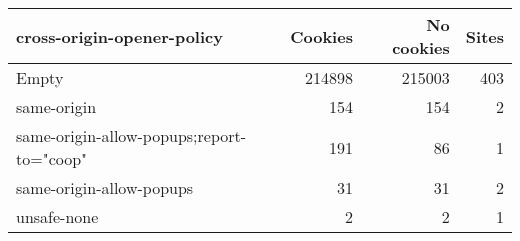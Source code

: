 \begin{tabular}{lrrr}
\toprule
               cross-origin-opener-policy &  Cookies &  No cookies &  Sites \\
\midrule
                                    Empty &   214898 &      215003 &    403 \\
                              same-origin &      154 &         154 &      2 \\
same-origin-allow-popups;report-to="coop" &      191 &          86 &      1 \\
                 same-origin-allow-popups &       31 &          31 &      2 \\
                              unsafe-none &        2 &           2 &      1 \\
\bottomrule
\end{tabular}
